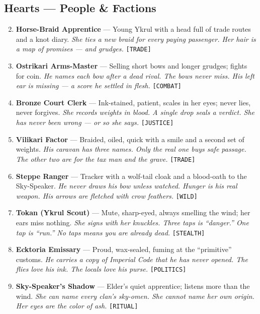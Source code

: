 {{\subsection*{Hearts --- People \& Factions}
\label{sec:midh-ahkaz-people}
\begin{enumerate}
\setcounter{enumi}{1}
\item {} \textbf{Horse-Braid Apprentice} --- Young Ykrul with a head full of trade routes and a knot diary. \hfill \textit{She ties a new braid for every paying passenger. Her hair is a map of promises --- and grudges.} \texttt{[TRADE]}
\item {} \textbf{Ostrikari Arms-Master} --- Selling short bows and longer grudges; fights for coin. \hfill \textit{He names each bow after a dead rival. The bows never miss. His left ear is missing --- a score he settled in flesh.} \texttt{[COMBAT]}
\item {} \textbf{Bronze Court Clerk} --- Ink-stained, patient, scales in her eyes; never lies, never forgives. \hfill \textit{She records weights in blood. A single drop seals a verdict. She has never been wrong --- or so she says.} \texttt{[JUSTICE]}
\item {} \textbf{Vilikari Factor} --- Braided, oiled, quick with a smile and a second set of weights. \hfill \textit{His caravan has three names. Only the real one buys safe passage. The other two are for the tax man and the grave.} \texttt{[TRADE]}
\item {} \textbf{Steppe Ranger} --- Tracker with a wolf-tail cloak and a blood-oath to the Sky-Speaker. \hfill \textit{He never draws his bow unless watched. Hunger is his real weapon. His arrows are fletched with crow feathers.} \texttt{[WILD]}
\item {} \textbf{Tokan (Ykrul Scout)} --- Mute, sharp-eyed, always smelling the wind; her ears miss nothing. \hfill \textit{She signs with her knuckles. Three taps is ``danger.'' One tap is ``run.'' No taps means you are already dead.} \texttt{[STEALTH]}
\item {} \textbf{Ecktoria Emissary} --- Proud, wax-sealed, fuming at the ``primitive'' customs. \hfill \textit{He carries a copy of Imperial Code that he has never opened. The flies love his ink. The locals love his purse.} \texttt{[POLITICS]}
\item {} \textbf{Sky-Speaker's Shadow} --- Elder's quiet apprentice; listens more than the wind. \hfill \textit{She can name every clan's sky-omen. She cannot name her own origin. Her eyes are the color of ash.} \texttt{[RITUAL]}

\end{enumerate}}}

